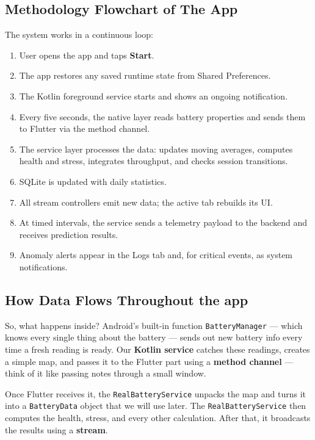 \documentclass[12pt,a4paper]{report}
\begin{document}
\subsection{Methodology Flowchart of The App}

The system works in a continuous loop:

\begin{enumerate}
  \item User opens the app and taps \textbf{Start}.
  \item The app restores any saved runtime state from Shared Preferences.
  \item The Kotlin foreground service starts and shows an ongoing notification.
  \item Every five seconds, the native layer reads battery properties and sends
        them to Flutter via the method channel.
  \item The service layer processes the data: updates moving averages, computes
        health and stress, integrates throughput, and checks session transitions.
  \item SQLite is updated with daily statistics.
  \item All stream controllers emit new data; the active tab rebuilds its UI.
  \item At timed intervals, the service sends a telemetry payload to the
        backend and receives prediction results.
  \item Anomaly alerts appear in the Logs tab and, for critical events, as
        system notifications.
\end{enumerate}

\subsection{How Data Flows Throughout the app}

So, what happens inside? Android's built-in function \texttt{BatteryManager} — which knows every single thing about the battery — sends out new battery info every time a fresh reading is ready. Our \textbf{Kotlin service} catches these readings, creates a simple map, and passes it to the Flutter part using a \textbf{method channel} — think of it like passing notes through a small window.

Once Flutter receives it, the \texttt{RealBatteryService} unpacks the map and turns it into a \texttt{BatteryData} object that we will use later. The \texttt{RealBatteryService} then computes the health, stress, and every other calculation. After that, it broadcasts the results using a \textbf{stream}.
\end{document}
